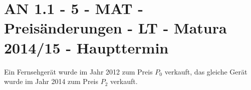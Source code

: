 \section{AN 1.1 - 5 - MAT - Preisänderungen - LT - Matura 2014/15 - Haupttermin}

\begin{beispiel}[AN 1.1]{1} %
Ein Fernsehgerät wurde im Jahr 2012 zum Preis $P_0$ verkauft, das gleiche Gerät wurde im Jahr
2014 zum Preis $P_2$ verkauft.

\end{beispiel}